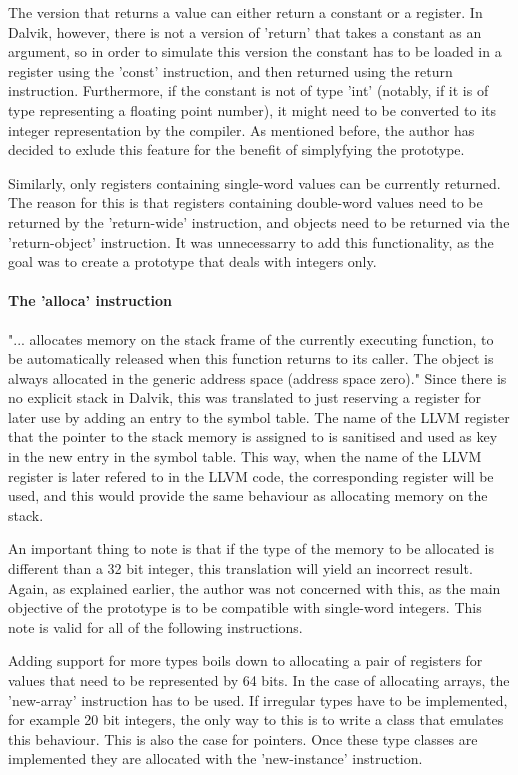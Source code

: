 \documentclass[parskip]{cs4rep}
\begin{document}
The version that returns a value can either return a constant or a register. In Dalvik, however, there is not a version of 'return' that takes a constant as an argument, so in order to simulate this version the constant has to be loaded in a register using the 'const' instruction, and then returned using the return instruction. Furthermore, if the constant is not of type 'int' (notably, if it is of type representing a floating point number), it might need to be converted to its integer representation by the compiler. As mentioned before, the author has decided to exlude this feature for the benefit of simplyfying the prototype.

Similarly, only registers containing single-word values can be currently returned. The reason for this is that registers containing double-word values need to be returned by the 'return-wide' instruction, and objects need to be returned via the 'return-object' instruction. It was unnecessarry to add this functionality, as the goal was to create a prototype that deals with integers only.

\paragraph{The 'alloca' instruction} "... allocates memory on the stack frame of the currently executing function, to be automatically released when this function returns to its caller. The object is always allocated in the generic address space (address space zero)."\cite{P11} Since there is no explicit stack in Dalvik, this was translated to just reserving a register for later use by adding an entry to the symbol table. The name of the LLVM register that the pointer to the stack memory is assigned to is sanitised and used as key in the new entry in the symbol table. This way, when the name of the LLVM register is later refered to in the LLVM code, the corresponding register will be used, and this would provide the same behaviour as allocating memory on the stack.

An important thing to note is that if the type of the memory to be allocated is different than a 32 bit integer, this translation will yield an incorrect result. Again, as explained earlier, the author was not concerned with this, as the main objective of the prototype is to be compatible with single-word integers. This note is valid for all of the following instructions.

Adding support for more types boils down to allocating a pair of registers for values that need to be represented by 64 bits. In the case of allocating arrays, the 'new-array' instruction has to be used. If irregular types have to be implemented, for example 20 bit integers, the only way to this is to write a class that emulates this behaviour. This is also the case for pointers. Once these type classes are implemented they are allocated with the 'new-instance' instruction.
\end{document}
